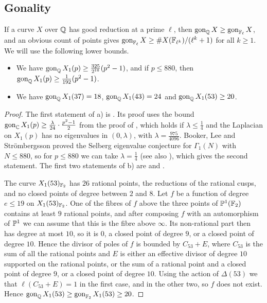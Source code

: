 \subsection{Gonality}
If a curve $X$ over $\mathbb{Q}$ has good reduction at a prime $\ell$, then $\operatorname{gon}_{\mathbb{Q}} X\geq\operatorname{gon}_{\mathbb{F}_\ell}X$, and an obvious count of points gives $\operatorname{gon}_{\mathbb{F}_\ell}X\geq\#X(\mathbb{F}_{\ell^k})/(\ell^k+1)$ for all $k\geq 1$. We will use the following lower bounds.

\begin{proposition}\label{prop:gonality}
\begin{itemize}
\item[a)] We have $\operatorname{gon}_{\mathbb{Q}} X_1(p)\geq\frac{325}{2^{16}}(p^2-1)$, and if $p\leq 880$, then $\operatorname{gon}_{\mathbb{Q}} X_1(p)\geq\frac{1}{192}(p^2-1)$.
\item[b)] We have $\operatorname{gon}_{\mathbb{Q}} X_1(37)=18$, $\operatorname{gon}_{\mathbb{Q}} X_1(43)=24$ and $\operatorname{gon}_{\mathbb{Q}} X_1(53)\geq 20$.
\end{itemize}
\end{proposition}

\begin{proof}
The first statement of a) is \cite[Theorem 3.3]{DSt}. Its proof uses the bound $\operatorname{gon}_{\mathbb{C}} X_1(p)\geq\frac{\lambda}{24}\cdot\frac{p^2-1}{2}$ from the proof of \cite[Theorem 0.1]{abramovich}, which holds if $\lambda\leq\frac14$ and the Laplacian on $X_1(p)$ has no eigenvalues in $(0,\lambda)$, with $\lambda=\frac{975}{4096}$. Booker, Lee and Strömbergsson \cite[Theorem 1.1]{BLS} proved the Selberg eigenvalue conjecture for $\Gamma_1(N)$ with $N\leq 880$, so for $p\leq 880$ we can take $\lambda=\frac14$ (see also \cite[Remark 3.4]{DSt}), which gives the second statement. The first two statements of b) are \cite[Table 1]{DvH} and \cite[Theorem D]{varivoda}.

The curve $X_1(53)_{\mathbb{F}_2}$ has $26$ rational points, the reductions of the rational cusps, and no closed points of degree between $2$ and $8$. Let $f$ be a function of degree $e\leq 19$ on $X_1(53)_{\mathbb{F}_2}$. One of the fibres of $f$ above the three points of $\mathbb{P}^1(\mathbb{F}_2)$ contains at least $9$ rational points, and after composing $f$ with an automorphism of $\mathbb{P}^1$ we can assume that this is the fibre above $\infty$. Its non-rational part then has degree at most $10$, so it is $0$, a closed point of degree $9$, or a closed point of degree $10$. Hence the divisor of poles of $f$ is bounded by $C_{53}+E$, where $C_{53}$ is the sum of all the rational points and $E$ is either an effective divisor of degree $10$ supported on the rational points, or the sum of a rational point and a closed point of degree $9$, or a closed point of degree $10$. Using the action of $\Delta(53)$ we  that $\ell(C_{53}+E)=1$ in the first case, and  in the other two, so $f$ does not exist. Hence $\operatorname{gon}_{\mathbb{Q}} X_1(53)\geq\operatorname{gon}_{\mathbb{F}_2}X_1(53)\geq20$.
\end{proof}

